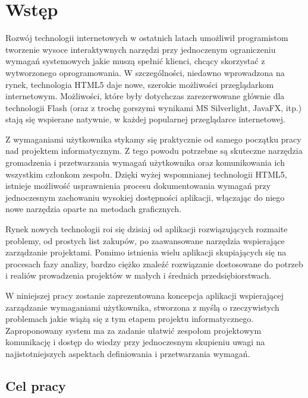 \chapter{Wstęp}

    Rozwój technologii internetowych w ostatnich latach umożliwił programistom tworzenie wysoce interaktywnych narzędzi przy jednoczenym ograniczeniu wymagań systemowych jakie muszą spełnić klienci, chcący skorzystać z wytworzonego oprogramowania. W szczególności, niedawno wprowadzona na rynek, technologia HTML5 daje nowe, szerokie możliwości przeglądarkom internetowym. Możliwości, które były dotychczas zarezerwowane głównie dla technologii Flash (oraz z trochę gorszymi wynikami MS Silverlight, JavaFX, itp.) stają się wspierane natywnie, w każdej popularnej przeglądarce internetowej. 

    Z wymaganiami użytkownika stykamy się praktycznie od samego początku pracy nad projektem informatycznym. Z tego powodu potrzebne są skuteczne narzędzia gromadzenia i przetwarzania wymagań użytkownika oraz komunikowania ich wszystkim członkom zespołu. Dzięki wyżej wspomnianej technologii HTML5, istnieje możliwość usprawnienia procesu dokumentowania wymagań przy jednoczesnym zachowaniu wysokiej dostępności aplikacji, włączając do niego nowe narzędzia oparte na metodach graficznych. 

    Rynek nowych technologii roi się dzisiaj od aplikacji rozwiązujących rozmaite problemy, od prostych list zakupów, po zaawansowane narzędzia wspierające zarządzanie projektami. Pomimo istnienia wielu aplikacji skupiających się na procesach fazy analizy, bardzo ciężko znaleźć rozwiązanie dostosowane do potrzeb i realiów prowadzenia projektów w małych i średnich przedsiębiorstwach. 
          
    W niniejszej pracy zostanie zaprezentowana koncepcja aplikacji wspierającej zarządzanie wymaganiami użytkownika, stworzona z myślą o rzeczywistych problemach jakie wiążą się z tym etapem projektu informatycznego. Zaproponowany system ma za zadanie ułatwić zespołom projektowym komunikację i dostęp do wiedzy przy jednoczesnym skupieniu uwagi na najistotniejszych aspektach definiowania i przetwarzania wymagań.


    \section{Cel pracy}

